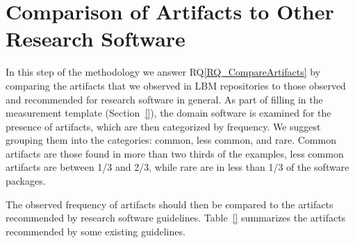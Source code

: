 \documentclass[runningheads]{llncs}
\newcommand{\rqref}[1]{RQ\ref{#1}}
\begin{document}
\section{Comparison of Artifacts to Other Research Software}
\label{Sec_CompareArtifacts}

In this step of the methodology we answer \rqref{RQ_CompareArtifacts} by
comparing the artifacts that we observed in LBM repositories to those observed
and recommended for research software in general.  As part of filling in the
measurement template (Section~\ref{}), the domain software is examined for the
presence of artifacts, which are then categorized by frequency. We suggest
grouping them into the categories: common, less common, and rare.  Common
artifacts are those found in more than two thirds of the examples, less common
artifacts are between 1/3 and 2/3, while rare are in less than 1/3 of the
software packages.  

The observed frequency of artifacts should then be compared to the artifacts
recommended by research software guidelines.  Table~\ref{} summarizes the
artifacts recommended by some existing guidelines.  
\end{document}
